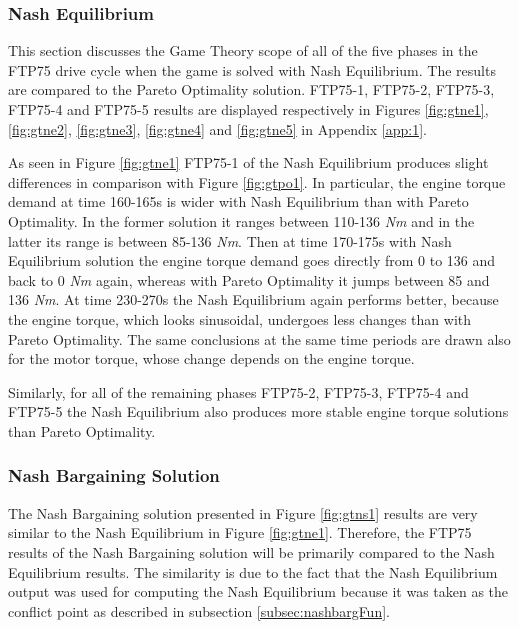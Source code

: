 \subsubsection{Nash Equilibrium}
This section discusses the Game Theory scope of all of the five phases in the FTP75 drive cycle when the game is solved with Nash Equilibrium. The results are compared to the Pareto Optimality solution. FTP75-1, FTP75-2, FTP75-3, FTP75-4 and FTP75-5 results are displayed respectively in Figures \ref{fig:gtne1}, \ref{fig:gtne2}, \ref{fig:gtne3}, \ref{fig:gtne4} and \ref{fig:gtne5} in Appendix \ref{app:1}.

As seen in Figure \ref{fig:gtne1} FTP75-1 of the Nash Equilibrium produces slight differences in comparison with Figure \ref{fig:gtpo1}. In particular, the engine torque demand at time 160-165s is wider with Nash Equilibrium than with Pareto Optimality. In the former solution it ranges between 110-136 \textit{Nm} and in the latter its range is between 85-136 \textit{Nm}. Then at time 170-175s with Nash Equilibrium solution the engine torque demand goes directly from 0 to 136 and back to 0 \textit{Nm} again, whereas with Pareto Optimality it jumps between 85 and 136 \textit{Nm}. At time 230-270s the Nash Equilibrium again performs better, because the engine torque, which looks sinusoidal, undergoes less changes than with Pareto Optimality. The same conclusions at the same time periods are drawn also for the motor torque, whose change depends on the engine torque.

Similarly, for all of the remaining phases FTP75-2, FTP75-3, FTP75-4 and FTP75-5 the Nash Equilibrium also produces more stable engine torque solutions than Pareto Optimality.

\subsubsection{Nash Bargaining Solution}
The Nash Bargaining solution presented in Figure \ref{fig:gtns1} results are very similar to the Nash Equilibrium in Figure \ref{fig:gtne1}. Therefore, the FTP75 results of the Nash Bargaining solution will be primarily compared to the Nash Equilibrium results. The similarity is due to the fact that the Nash Equilibrium output was used for computing the Nash Equilibrium because it was taken as the conflict point as described in subsection \ref{subsec:nashbargFun}.

